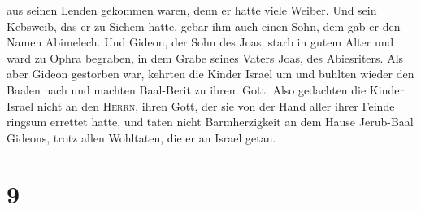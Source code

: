 aus seinen Lenden gekommen waren, denn er hatte viele Weiber.
 Und sein Kebsweib, das er zu Sichem hatte, gebar ihm
auch einen Sohn, dem gab er den Namen Abimelech.  Und
Gideon, der Sohn des Joas, starb in gutem Alter und ward zu Ophra
begraben, in dem Grabe seines Vaters Joas, des Abiesriters.
 Als aber Gideon gestorben war, kehrten die Kinder Israel
um und buhlten wieder den Baalen nach und machten Baal-Berit zu ihrem
Gott.  Also gedachten die Kinder Israel nicht an den
\textsc{Herrn}, ihren Gott, der sie von der Hand aller ihrer Feinde
ringsum errettet hatte,  und taten nicht Barmherzigkeit
an dem Hause Jerub-Baal Gideons, trotz allen Wohltaten, die er an Israel
getan.

\hypertarget{section-8}{%
\section{9}\label{section-8}}

